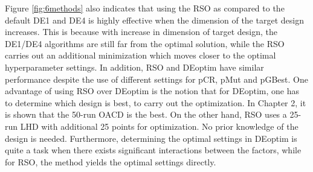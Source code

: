 \documentclass [PhD] {package/uclathes}
\begin{document}
Figure \ref{fig:6methods} also indicates that using the RSO as compared to the default DE1 and DE4 is highly effective when the dimension of the target design increases. This is because with increase in dimension of target design, the DE1/DE4 algorithms are still far from the optimal solution, while the RSO carries out an additional minimization which moves closer to the optimal hyperparameter settings. In addition, RSO and DEoptim have similar performance despite the use of different settings for pCR, pMut and pGBest. One advantage of using RSO over DEoptim is the notion that for DEoptim, one has to determine which design is best, to carry out the optimization. In Chapter 2, it is shown that the 50-run OACD is the best. On the other hand, RSO uses a 25-run LHD with additional 25 points for optimization. No prior knowledge of the design is needed. Furthermore, determining the optimal settings in DEoptim is quite a task when there exists significant interactions between the factors, while for RSO, the method yields the optimal settings directly.


\end{document}
